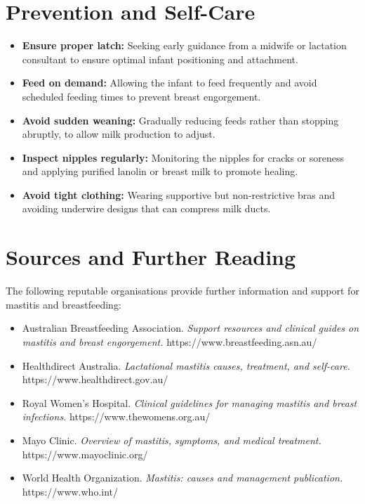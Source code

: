 \section*{Prevention and Self-Care}
\begin{itemize}
    \item \textbf{Ensure proper latch:} Seeking early guidance from a midwife or lactation consultant to ensure optimal infant positioning and attachment.
    \item \textbf{Feed on demand:} Allowing the infant to feed frequently and avoid scheduled feeding times to prevent breast engorgement.
    \item \textbf{Avoid sudden weaning:} Gradually reducing feeds rather than stopping abruptly, to allow milk production to adjust.
    \item \textbf{Inspect nipples regularly:} Monitoring the nipples for cracks or soreness and applying purified lanolin or breast milk to promote healing.
    \item \textbf{Avoid tight clothing:} Wearing supportive but non-restrictive bras and avoiding underwire designs that can compress milk ducts.
\end{itemize}

\section*{Sources and Further Reading}
The following reputable organisations provide further information and support for mastitis and breastfeeding:
\begin{itemize}
    \item Australian Breastfeeding Association. \textit{Support resources and clinical guides on mastitis and breast engorgement.} https://www.breastfeeding.asn.au/
    \item Healthdirect Australia. \textit{Lactational mastitis causes, treatment, and self-care.} https://www.healthdirect.gov.au/
    \item Royal Women's Hospital. \textit{Clinical guidelines for managing mastitis and breast infections.} https://www.thewomens.org.au/
    \item Mayo Clinic. \textit{Overview of mastitis, symptoms, and medical treatment.} https://www.mayoclinic.org/
    \item World Health Organization. \textit{Mastitis: causes and management publication.} https://www.who.int/
\end{itemize}
